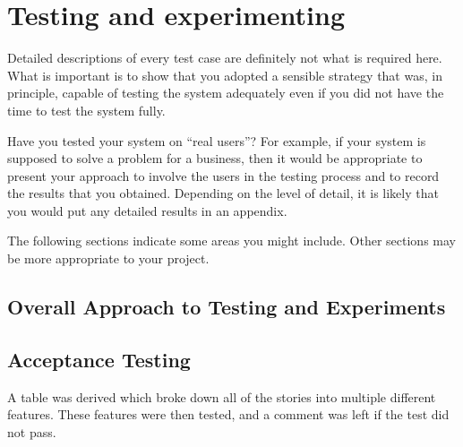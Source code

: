 \chapter{Testing and experimenting}

Detailed descriptions of every test case are definitely not what is required here. What is important is to show that you adopted a sensible strategy that was, in principle, capable of testing the system adequately even if you did not have the time to test the system fully.

Have you tested your system on ``real users''? For example, if your system is supposed to solve a problem for a business, then it would be appropriate to present your approach to involve the users in the testing process and to record the results that you obtained. Depending on the level of detail, it is likely that you would put any detailed results in an appendix.

The following sections indicate some areas you might include. Other sections may be more appropriate to your project. 

\section{Overall Approach to Testing and Experiments}

\section{Acceptance Testing}
A table was derived which broke down all of the stories into multiple different features. These features were then tested, and a comment was left if the test did not pass.

